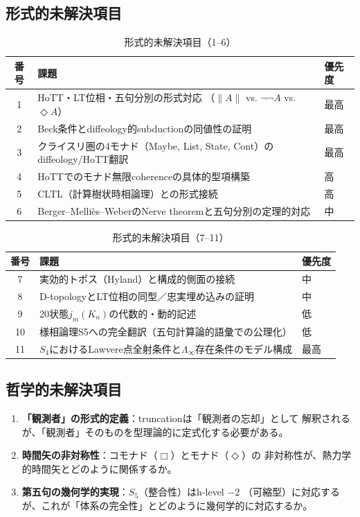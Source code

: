 \documentclass[11pt,a4paper]{ltjsarticle}
\theoremstyle{remark}
\newcommand{\LawvereInfinity}{\Lambda_\infty}
\begin{document}
\subsection{形式的未解決項目}

\begin{table}[htbp]
\centering
\caption{形式的未解決項目（1--6）}
\label{tab:open-problems}
\small
\begin{tabularx}{\textwidth}{@{}c >{\raggedright\arraybackslash}X l@{}}
\toprule
番号 & 課題 & 優先度 \\
\midrule
1 & HoTT・LT位相・五句分別の形式対応
（$\lVert A\rVert$ vs. $\neg\neg A$ vs. $\Diamond A$） & 最高 \\
2 & Beck条件とdiffeology的subductionの同値性の証明 & 最高 \\
3 & クライスリ圏の4モナド（Maybe, List, State, Cont）のdiffeology/HoTT翻訳 & 最高 \\
4 & HoTTでのモナド無限coherenceの具体的型項構築 & 高 \\
5 & CLTL（計算樹状時相論理）との形式接続 & 高 \\
6 & Berger--Melliès--WeberのNerve theoremと五句分別の定理的対応 & 中 \\
\bottomrule
\end{tabularx}
\end{table}

\begin{table}[htbp]
\centering
\caption{形式的未解決項目（7--11）}
\small
\begin{tabularx}{\textwidth}{@{}c >{\raggedright\arraybackslash}X l@{}}
\toprule
番号 & 課題 & 優先度 \\
\midrule
7 & 実効的トポス（Hyland）と構成的側面の接続 & 中 \\
8 & D-topologyとLT位相の同型／忠実埋め込みの証明 & 中 \\
9 & 20状態$j_m(K_n)$の代数的・動的記述 & 低 \\
10 & 様相論理S5への完全翻訳（五句計算論的語彙での公理化） & 低 \\
11 & $S_4$におけるLawvere点全射条件と$\LawvereInfinity$存在条件のモデル構成 & 最高 \\
\bottomrule
\end{tabularx}
\end{table}

\subsection{哲学的未解決項目}

\begin{enumerate}
  \item \textbf{「観測者」の形式的定義}：truncationは「観測者の忘却」として
  解釈されるが、「観測者」そのものを型理論的に定式化する必要がある。
  \item \textbf{時間矢の非対称性}：コモナド（$\Box$）とモナド（$\Diamond$）の
  非対称性が、熱力学的時間矢とどのように関係するか。
  \item \textbf{第五句の幾何学的実現}：$S_5$（整合性）はh-level $-2$
  （可縮型）に対応するが、これが「体系の完全性」とどのように幾何学的に対応するか。
\end{enumerate}
\end{document}
